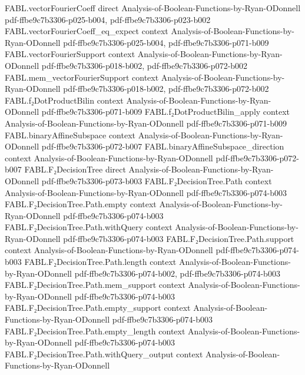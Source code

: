 \begin{theorem}
\proofstep
  {FABL.vectorFourierCoeff}
  {direct}
  {Analysis-of-Boolean-Functions-by-Ryan-ODonnell}
  {pdf-ffbe9c7b3306-p025-b004,
    pdf-ffbe9c7b3306-p023-b002}
\proofstep
  {FABL.vectorFourierCoeff_eq_expect}
  {context}
  {Analysis-of-Boolean-Functions-by-Ryan-ODonnell}
  {pdf-ffbe9c7b3306-p025-b004,
    pdf-ffbe9c7b3306-p071-b009}
\proofstep
  {FABL.vectorFourierSupport}
  {context}
  {Analysis-of-Boolean-Functions-by-Ryan-ODonnell}
  {pdf-ffbe9c7b3306-p018-b002,
    pdf-ffbe9c7b3306-p072-b002}
\proofstep
  {FABL.mem_vectorFourierSupport}
  {context}
  {Analysis-of-Boolean-Functions-by-Ryan-ODonnell}
  {pdf-ffbe9c7b3306-p018-b002,
    pdf-ffbe9c7b3306-p072-b002}
\proofstep
  {FABL.f₂DotProductBilin}
  {context}
  {Analysis-of-Boolean-Functions-by-Ryan-ODonnell}
  {pdf-ffbe9c7b3306-p071-b009}
\proofstep
  {FABL.f₂DotProductBilin_apply}
  {context}
  {Analysis-of-Boolean-Functions-by-Ryan-ODonnell}
  {pdf-ffbe9c7b3306-p071-b009}
\proofstep
  {FABL.binaryAffineSubspace}
  {context}
  {Analysis-of-Boolean-Functions-by-Ryan-ODonnell}
  {pdf-ffbe9c7b3306-p072-b007}
\proofstep
  {FABL.binaryAffineSubspace_direction}
  {context}
  {Analysis-of-Boolean-Functions-by-Ryan-ODonnell}
  {pdf-ffbe9c7b3306-p072-b007}
\proofstep
  {FABL.F₂DecisionTree}
  {direct}
  {Analysis-of-Boolean-Functions-by-Ryan-ODonnell}
  {pdf-ffbe9c7b3306-p073-b003}
\proofstep
  {FABL.F₂DecisionTree.Path}
  {context}
  {Analysis-of-Boolean-Functions-by-Ryan-ODonnell}
  {pdf-ffbe9c7b3306-p074-b003}
\proofstep
  {FABL.F₂DecisionTree.Path.empty}
  {context}
  {Analysis-of-Boolean-Functions-by-Ryan-ODonnell}
  {pdf-ffbe9c7b3306-p074-b003}
\proofstep
  {FABL.F₂DecisionTree.Path.withQuery}
  {context}
  {Analysis-of-Boolean-Functions-by-Ryan-ODonnell}
  {pdf-ffbe9c7b3306-p074-b003}
\proofstep
  {FABL.F₂DecisionTree.Path.support}
  {context}
  {Analysis-of-Boolean-Functions-by-Ryan-ODonnell}
  {pdf-ffbe9c7b3306-p074-b003}
\proofstep
  {FABL.F₂DecisionTree.Path.length}
  {context}
  {Analysis-of-Boolean-Functions-by-Ryan-ODonnell}
  {pdf-ffbe9c7b3306-p074-b002,
    pdf-ffbe9c7b3306-p074-b003}
\proofstep
  {FABL.F₂DecisionTree.Path.mem_support}
  {context}
  {Analysis-of-Boolean-Functions-by-Ryan-ODonnell}
  {pdf-ffbe9c7b3306-p074-b003}
\proofstep
  {FABL.F₂DecisionTree.Path.empty_support}
  {context}
  {Analysis-of-Boolean-Functions-by-Ryan-ODonnell}
  {pdf-ffbe9c7b3306-p074-b003}
\proofstep
  {FABL.F₂DecisionTree.Path.empty_length}
  {context}
  {Analysis-of-Boolean-Functions-by-Ryan-ODonnell}
  {pdf-ffbe9c7b3306-p074-b003}
\proofstep
  {FABL.F₂DecisionTree.Path.withQuery_output}
  {context}
  {Analysis-of-Boolean-Functions-by-Ryan-ODonnell}

\end{theorem}
